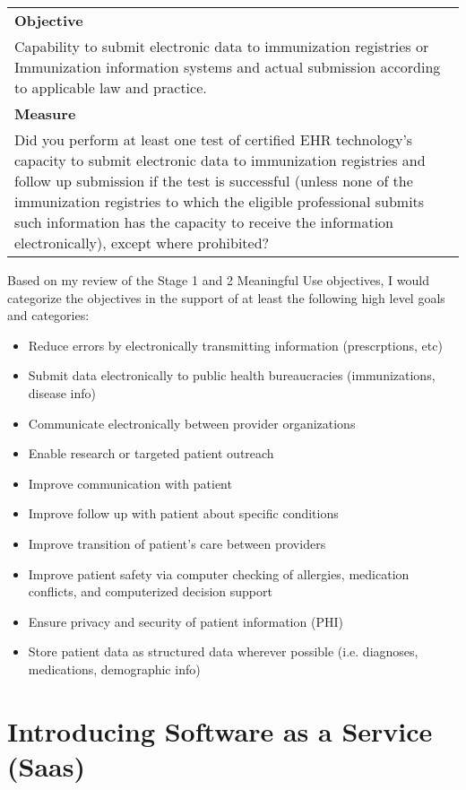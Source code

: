 \documentclass[10pt]{article}
\begin{document}
\begin{center}
\begin{tabular}{ p{15cm} }
	\hline
\textbf{Objective} \\
Capability to submit electronic data to immunization registries or Immunization information systems and actual submission according to applicable law and practice. \\
\textbf{Measure} \\
Did you perform at least one test of certified EHR technology’s capacity to submit electronic data to immunization registries and follow up submission if the test is successful (unless none of the immunization registries to which the eligible professional submits such information has the capacity to receive the information electronically), except where prohibited? \\
	\hline
\end{tabular}
\end{center}

Based on my review of the Stage 1 and 2 Meaningful Use objectives, I would categorize the objectives in the support of at least the following high level goals and categories:
\begin{itemize}
	\item Reduce errors by electronically transmitting information (prescrptions, etc)
	\item Submit data electronically to public health bureaucracies (immunizations, disease info)
	\item Communicate electronically between provider organizations
	\item Enable research or targeted patient outreach
	\item Improve communication with patient
	\item Improve follow up with patient about specific conditions
	\item Improve transition of patient's care between providers
	\item Improve patient safety via computer checking of allergies, medication conflicts, and computerized decision support
	\item Ensure privacy and security of patient information (PHI)
	\item Store patient data as structured data wherever possible (i.e. diagnoses, medications, demographic info)
\end{itemize}

\section{Introducing Software as a Service (Saas)}
\label{sec:Intro_SaaS}
\end{document}
